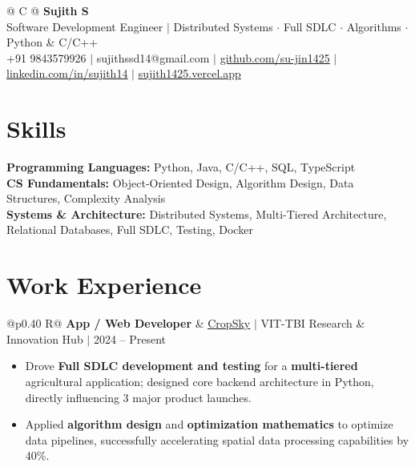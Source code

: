 \documentclass[a4paper,10pt]{article}
\newcommand{\ulink}[2]{\href{#1}{\uline{#2}}}
\newcommand{\subheading}[1]{{\color[HTML]{0A0A0A}\fontsize{12}{14}\selectfont\bfseries #1}}
\newcommand{\meta}[1]{{\color[HTML]{5C5C5C}\fontsize{10.5}{12.5}\selectfont #1}}
\begin{document}
\pagestyle{empty}

\begin{tabularx}{\linewidth}{@{} C @{}}
{\color[HTML]{000000}\fontsize{30}{35}\selectfont\bfseries Sujith S} \\[5pt]
{\fontsize{10.5}{12.5}\selectfont\color[HTML]{3A3A3A}
Software Development Engineer $|$ Distributed Systems $\cdot$ Full SDLC $\cdot$ Algorithms $\cdot$ Python \& C/C++} \\[6pt]
{\fontsize{9.5}{11.5}\selectfont\textcolor[HTML]{3A3A3A}{+91 9843579926 $|$ sujithssd14@gmail.com $|$ \ulink{https://github.com/su-jin1425}{github.com/su-jin1425} $|$ \ulink{https://linkedin.com/in/sujith14}{linkedin.com/in/sujith14} $|$ \ulink{https://sujith1425.vercel.app}{sujith1425.vercel.app}}}
\end{tabularx}

\vspace{2pt}

\section{Skills}
\vspace{3pt}
{\color[HTML]{0A0A0A}\fontsize{11}{14}\selectfont
\textbf{Programming Languages:} Python, Java, C/C++, SQL, TypeScript \\[2pt]
\textbf{CS Fundamentals:} Object-Oriented Design, Algorithm Design, Data Structures, Complexity Analysis \\[2pt]
\textbf{Systems \& Architecture:} Distributed Systems, Multi-Tiered Architecture, Relational Databases, Full SDLC, Testing, Docker}

\vspace{2pt}

\section{Work Experience}
\vspace{2pt}

\begin{tabularx}{\linewidth}{@{}p{0.40\linewidth} R@{}}
\subheading{App / Web Developer} & \meta{\ulink{https://sites.google.com/view/cropsky/home}{CropSky} $|$ VIT-TBI Research \& Innovation Hub $|$ 2024 -- Present}
\end{tabularx}
\begin{itemize}[nosep, leftmargin=1.5em, itemsep=1pt, topsep=2pt]
  \item {\color[HTML]{0A0A0A}\fontsize{11}{14}\selectfont Drove \textbf{Full SDLC development and testing} for a \textbf{multi-tiered} agricultural application; designed core backend architecture in Python, directly influencing 3 major product launches.}
  \item {\color[HTML]{0A0A0A}\fontsize{11}{14}\selectfont Applied \textbf{algorithm design} and \textbf{optimization mathematics} to optimize data pipelines, successfully accelerating spatial data processing capabilities by 40\%.}
\end{itemize}
\end{document}
